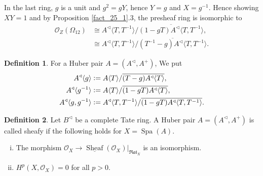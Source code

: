 \documentclass[10pt]{article}
\numberwithin{equation}{section}
\theoremstyle{definition}
\newtheorem{definition}{Definition}[subsection]
\DeclareMathOperator{\Spa}{Spa}
\DeclareMathOperator{\Sheaf}{Sheaf}
\newcommand{\defeq}{\vcentcolon=}
\newcommand{\cO}[0]{\mathcal{O}}
\newcommand{\Rat}[0]{\mathfrak{Rat}}
\begin{document}
In the last ring, $g$ is a unit and $g^2= gY$, hence $Y = g$ and $X= g^{-1}$. Hence showing $XY=1$ and by Proposition \ref{fact_25_1}.3, the presheaf ring is isomorphic to
\begin{align*}
    \cO_Z(\Omega_{12}) &\cong A^\triangleleft\langle T,T^{-1}\rangle/\overline{(1-gT)A^\triangleleft\langle T,T^{-1}\rangle},\\
    &\cong A^\triangleleft\langle T,T^{-1}\rangle/\overline{(T^{-1}-g)A^\triangleleft\langle T,T^{-1}\rangle}.
\end{align*}

\begin{definition}
    \label{definition_25_2}
    For a Huber pair $A= (A^\triangleleft,A^+)$,
    We put 
\begin{align*}
    A^\triangleleft\langle g\rangle&\defeq A\langle T\rangle/\overline{(T-g)A^\triangleleft\langle T\rangle},\\
    A^\triangleleft\langle g^{-1}\rangle &\defeq A\langle T\rangle/\overline{(1-gT)A^\triangleleft\langle T\rangle},\\
    A^\triangleleft\langle g,g^{-1}\rangle &\defeq A^\triangleleft\langle T,T^{-1}\rangle /\overline{(1-gT)A^\triangleleft\langle T,T^{-1}\rangle}.
\end{align*}
\end{definition}

\begin{definition}
    Let $B^\triangleleft$ be a complete Tate ring. A Huber pair $A=(A^\triangleleft,A^+)$ is called sheafy if the following holds for $X= \Spa(A)$.
    \begin{enumerate}[i. ]
        \item The morphism $\cO_X\to \underline{\Sheaf}(\cO_X)|_{\Rat_X}$ is an isomorphism.
        \item $H^p(X,\cO_X) = 0$ for all $p>0$.
    \end{enumerate}
\end{definition}
\end{document}
